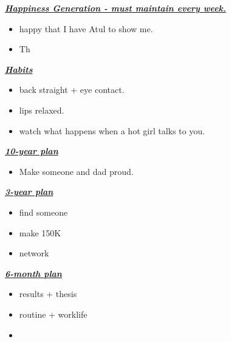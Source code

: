 \underline{\bf \it Happiness Generation - must maintain every week.}
        \begin{itemize}
          \tiny \item \tiny happy that I have Atul to show me.  
          \item \tiny Th
        \end{itemize}

    \underline{\bf \it Habits}
      \begin{itemize} 
        \tiny \item \tiny back straight + eye contact. 
      \item \tiny lips relaxed. 
      \item \tiny watch what happens when a hot girl talks to you. 
      \end{itemize} 



    \underline{\it \bf 10-year plan}   %
      \begin{itemize}
      \item \small Make someone and dad proud.
      \end{itemize}

 
    \underline{\it \bf 3-year plan}
      \begin{itemize}
      \item \small find someone
      \item \small make 150K
      \item \small network
      \end{itemize}


    \underline{\it \bf 6-month plan}
      \begin{itemize}
        \small \item \small results + thesis
      \item \small routine + worklife
      \item \small 
      \end{itemize}

